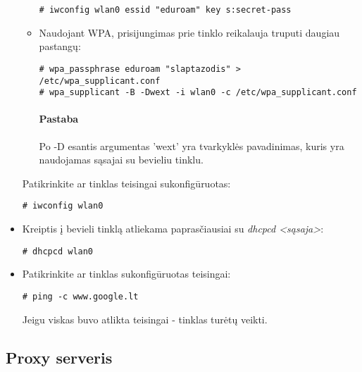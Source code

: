 \begin{itemize}
\begin{itemize}
              \begin{verbatim}
# iwconfig wlan0 essid "eduroam" key s:secret-pass
              \end{verbatim}

            \item Naudojant WPA, prisijungimas prie tinklo reikalauja
              truputi daugiau pastangų:

              \begin{verbatim}
# wpa_passphrase eduroam "slaptazodis" > /etc/wpa_supplicant.conf
# wpa_supplicant -B -Dwext -i wlan0 -c /etc/wpa_supplicant.conf
              \end{verbatim}

              \paragraph{Pastaba} Po -D esantis argumentas 'wext' yra
              tvarkyklės pavadinimas, kuris yra naudojamas sąsajai su
              bevieliu tinklu.

          \end{itemize}

          Patikrinkite ar tinklas teisingai sukonfigūruotas:

          \begin{verbatim}
# iwconfig wlan0
          \end{verbatim}

        \item Kreiptis į bevieli tinklą atliekama paprasčiausiai su
          \textsl{dhcpcd <sąsaja>}:
          
          \begin{verbatim}
# dhcpcd wlan0
          \end{verbatim}

        \item Patikrinkite ar tinklas sukonfigūruotas teisingai:

          \begin{verbatim}
# ping -c www.google.lt
          \end{verbatim}

          Jeigu viskas buvo atlikta teisingai - tinklas turėtų veikti.
          
      \end{itemize}

    \subsection{Proxy serveris}

